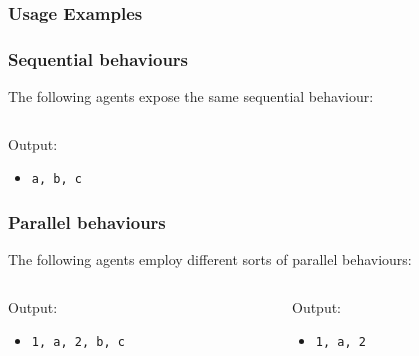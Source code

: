 \documentclass[presentation]{beamer}\mode<presentation>{\usetheme{AMSCesenaPurpleAndGold}}
\begin{document}
\subsubsection{Usage Examples}

\begin{frame}%
    \frametitle{Sequential behaviours}

    The following agents expose the same sequential behaviour:

    \vfill

    \begin{columns}
        \begin{column}{.48\linewidth}
            
        \end{column}
        \begin{column}{.48\linewidth}
            
        \end{column}
    \end{columns}

    \vfill

    Output:
    \begin{itemize}
        \item \texttt{a, b, c}
    \end{itemize}

\end{frame}

\begin{frame}%
    \frametitle{Parallel behaviours}

    The following agents employ different sorts of parallel behaviours:

    \vfill

    \begin{columns}
        \begin{column}{.48\linewidth}
            

            \vspace{1cm}

            Output:
            \begin{itemize}
                \item \texttt{1, a, 2, b, c}
            \end{itemize}
        \end{column}
        \begin{column}{.48\linewidth}
            

            \vspace{1cm}

            Output:
            \begin{itemize}
                \item \texttt{1, a, 2}
            \end{itemize}
        \end{column}
    \end{columns}

\end{frame}
\end{document}
